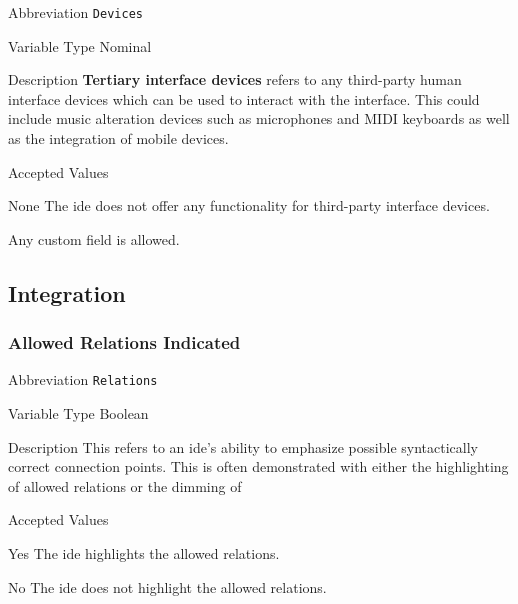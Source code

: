 \begin{AlignedDesc}
  \item[Abbreviation] \texttt{Devices}

  \item[Variable Type] Nominal

  \item[Description] \textbf{Tertiary interface devices} refers to any third-party human interface devices which can be used to interact with the interface.  This could include music alteration devices such as microphones and MIDI keyboards as well as the integration of mobile devices.

  \item[Accepted Values]

  \begin{AlignedDesc}
		\item[None] The \ac{ide} does not offer any functionality for third-party interface devices.
    \item[\textellipsis] Any custom field is allowed.
  \end{AlignedDesc}

\end{AlignedDesc}


\subsection{Integration}
\label{sec:integration}

\subsubsection{Allowed Relations Indicated}
\label{subsec:relations}

\begin{AlignedDesc}
  \item[Abbreviation] \texttt{Relations}

  \item[Variable Type] Boolean

  \item[Description] This refers to an \ac{ide}'s ability to emphasize possible syntactically correct connection points. This is often demonstrated with either the highlighting of allowed relations or the dimming of 

  \item[Accepted Values]

  \begin{AlignedDesc}
    \item[Yes] The \ac{ide} highlights the allowed relations.
		\item[No] The \ac{ide} does not highlight the allowed relations.
  \end{AlignedDesc}

\end{AlignedDesc}


